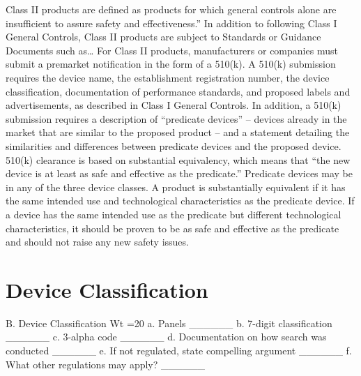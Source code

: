 \documentclass{article}
\begin{document}
Class II products are defined as products for which general controls
alone are insufficient to assure safety and effectiveness.” In
addition to following Class I General Controls, Class II products are
subject to Standards or Guidance Documents such as… For Class II
products, manufacturers or companies must submit a premarket
notification in the form of a 510(k). A 510(k) submission requires the
device name, the establishment registration number, the device
classification, documentation of performance standards, and proposed
labels and advertisements, as described in Class I General
Controls. In addition, a 510(k) submission requires a description of
“predicate devices” – devices already in the market that are similar
to the proposed product – and a statement detailing the similarities
and differences between predicate devices and the proposed
device. 510(k) clearance is based on substantial equivalency, which
means that “the new device is at least as safe and effective as the
predicate.” Predicate devices may be in any of the three device
classes. A product is substantially equivalent if it has the same
intended use and technological characteristics as the predicate
device. If a device has the same intended use as the predicate but
different technological characteristics, it should be proven to be as
safe and effective as the predicate and should not raise any new
safety issues.
	 

\section{Device Classification}
\label{sec:protocols}
B. Device Classification Wt =20%
a. Panels ______
b. 7-digit classification ______
c. 3-alpha code ______
d. Documentation on how search was conducted ______
e. If not regulated, state compelling argument ______
f. What other regulations may apply? ______
\end{document}
